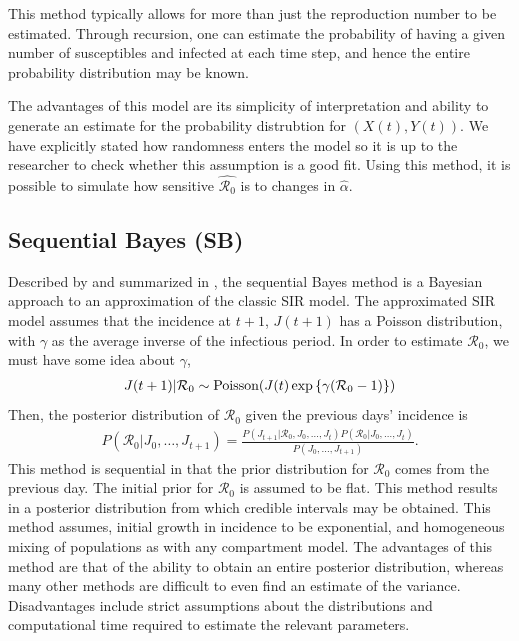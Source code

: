 \documentclass[12pt]{article}
\newcommand{\rr}{\ensuremath{\mathcal{R}_0}}
\begin{document}
This method typically allows for more than just the reproduction number to be estimated.  Through recursion, one can estimate the probability of having a given number of susceptibles and infected at each time step, and hence the entire probability distribution may be known.

The advantages of this model are its simplicity of interpretation and ability to generate an estimate for the probability distrubtion for $(X(t), Y(t))$.  We have explicitly stated how randomness enters the model so it is up to the researcher to check whether this assumption is a good fit.  Using this method, it is possible to simulate how sensitive $\hat{\rr}$ is to changes in $\hat{\alpha}$.





\subsection{Sequential Bayes (SB)}\label{sec:seqbayes}

Described by \cite{bettencourt2008} and summarized in \cite{obadia2012r0}, the sequential Bayes method is a Bayesian approach to an approximation of the classic SIR model.  The approximated SIR model assumes that the incidence at $t+1$, $J(t+1)$ has a Poisson distribution, with $\gamma$ as the  average inverse of the infectious period. In order to estimate $\rr$, we must have some idea about $\gamma$,
\begin{align*}
J(t+1) | \rr  \sim \textnormal{Poisson}( J(t) \exp \left \{  \gamma (\rr-1)\right \})
\end{align*}
Then, the posterior distribution of $\rr$ given the previous days' incidence is
\begin{align*}
  P(\rr | J_0, \dots, J_{t+1}) = \frac{P(J_{t+1} | \rr, J_0, \dots, J_t)P(\rr| J_0, \dots, J_t)}{P(J_0, \dots, J_{t+1})}.
\end{align*}
This method is sequential in that the prior distribution for $\rr$ comes from the previous day.  The initial prior for $\rr$ is assumed to be flat.  This method results in a posterior distribution from which credible intervals may be obtained.  This method assumes, initial growth in incidence to be exponential, and homogeneous mixing of populations as with any compartment model.  The advantages of this method are that of the ability to obtain an entire posterior distribution, whereas many other methods are difficult to even find an estimate of the variance.  Disadvantages include strict assumptions about the distributions and computational time required to estimate the relevant parameters.
\end{document}
